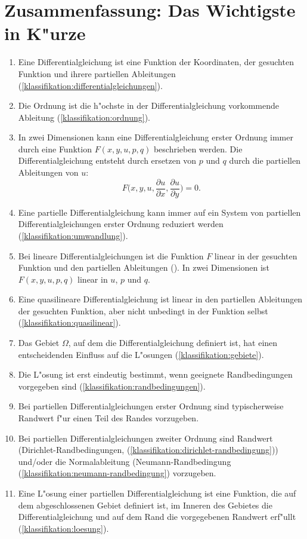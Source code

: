 \section{Zusammenfassung: Das Wichtigste in K"urze}
\begin{enumerate}
\item Eine Differentialgleichung ist eine Funktion
der Koordinaten, der gesuchten Funktion und ihrere partiellen Ableitungen
(\ref{klassifikation:differentialgleichungen}).
\item Die Ordnung ist die h"ochste in der Differentialgleichung vorkommende
Ableitung (\ref{klassifikation:ordnung}).
\item In zwei Dimensionen kann eine Differentialgleichung erster Ordnung
immer durch eine Funktion $F(x,y,u,p,q)$ beschrieben werden. Die
Differentialgleichung entsteht durch ersetzen von $p$ und $q$ durch
die partiellen Ableitungen von $u$:
\[
F\biggl(
x,y, u,
\frac{\partial u}{\partial x},
\frac{\partial u}{\partial y}
\biggr)=0.
\]
\item Eine partielle Differentialgleichung kann immer auf ein System
von partiellen Differentialgleichungen erster Ordnung reduziert werden
(\ref{klassifikation:umwandlung}).
\item Bei lineare Differentialgleichungen ist die Funktion $F$ linear
in der gesuchten Funktion und den partiellen Ableitungen
(\label{klassifikation:linear}). In zwei
Dimensionen ist $F(x,y,u,p,q)$ linear in $u$, $p$ und $q$.
\item Eine quasilineare Differentialgleichung ist linear in den
partiellen Ableitungen der gesuchten Funktion, aber nicht unbedingt
in der Funktion selbst (\ref{klassifikation:quasilinear}).
\item Das Gebiet $\Omega$, auf dem die Differentialgleichung definiert
ist, hat einen entscheidenden Einfluss auf die L"osungen (\ref{klassifikation:gebiete}).
\item Die L"osung ist erst eindeutig bestimmt, wenn geeignete Randbedingungen
vorgegeben sind (\ref{klassifikation:randbedingungen}). 
\item Bei partiellen Differentialgleichungen erster Ordnung sind typischerweise
Randwert f"ur einen Teil des Randes vorzugeben.
\item Bei partiellen Differentialgleichungen zweiter Ordnung sind
Randwert (Dirichlet-Randbedingungen,
(\ref{klassifikation:dirichlet-randbedingung}))
und/oder die Normalableitung
(Neumann-Randbedingung (\ref{klassifikation:neumann-randbedingung})
vorzugeben.
\item Eine L"osung einer partiellen Differentialgleichung ist eine
Funktion, die auf dem abgeschlossenen Gebiet definiert ist, im Inneren
des Gebietes die Differentialgleichung und auf dem Rand
die vorgegebenen Randwert erf"ullt (\ref{klassifikation:loesung}).

\end{enumerate}
